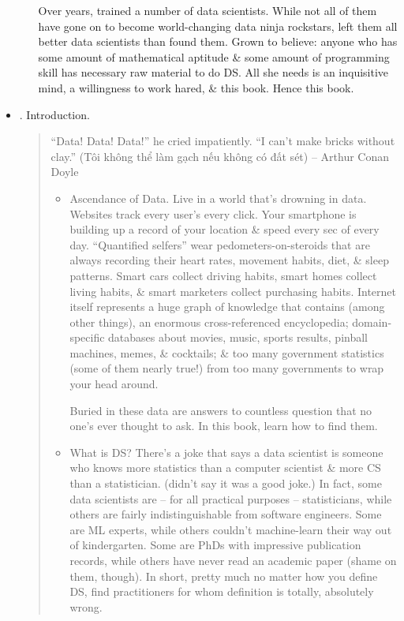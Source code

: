 \documentclass{article}
\begin{document}
\begin{itemize}
\begin{itemize}
		Over years, trained a number of data scientists. While not all of them have gone on to become world-changing data ninja rockstars, left them all better data scientists than found them. Grown to believe: anyone who has some amount of mathematical aptitude \& some amount of programming skill has necessary raw material to do DS. All she needs is an inquisitive mind, a willingness to work hared, \& this book. Hence this book.
	\end{itemize}
	\item {. Introduction.}
	\begin{quote}
		``Data! Data! Data!'' he cried impatiently. ``I can't make bricks without clay.'' (Tôi không thể làm gạch nếu không có đất sét) -- {\sc Arthur Conan Doyle}
		\begin{itemize}
			\item {\sf Ascendance of Data.} Live in a world that's drowning in data. Websites track every user's every click. Your smartphone is building up a record of your location \& speed every sec of every day. ``Quantified selfers'' wear pedometers-on-steroids that are always recording their heart rates, movement habits, diet, \& sleep patterns. Smart cars collect driving habits, smart homes collect living habits, \& smart marketers collect purchasing habits. Internet itself represents a huge graph of knowledge that contains (among other things), an enormous cross-referenced encyclopedia; domain-specific databases about movies, music, sports results, pinball machines, memes, \& cocktails; \& too many government statistics (some of them nearly true!) from too many governments to wrap your head around.
			
			Buried in these data are answers to countless question that no one's ever thought to ask. In this book, learn how to find them.
			\item {\sf What is DS?} There's a joke that says a data scientist is someone who knows more statistics than a computer scientist \& more CS than a statistician. (didn't say it was a good joke.) In fact, some data scientists are -- for all practical purposes -- statisticians, while others are fairly indistinguishable from software engineers. Some are ML experts, while others couldn't machine-learn their way out of kindergarten. Some are PhDs with impressive publication records, while others have never read an academic paper (shame on them, though). In short, pretty much no matter how you define DS, find practitioners for whom definition is totally, absolutely wrong.
			

\end{itemize}
\end{quote}
\end{itemize}
\end{document}
